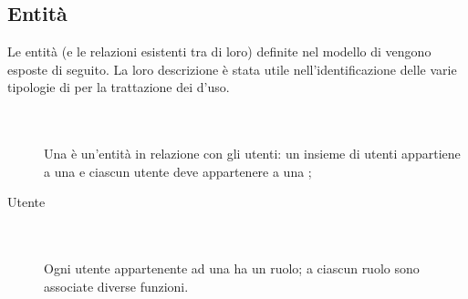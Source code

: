\subsection{Entit\`a}
Le entit\`a (e le relazioni esistenti tra di loro) definite nel modello  di  vengono esposte di seguito. La loro descrizione \`e stata utile nell'identificazione delle varie tipologie di  per la trattazione dei  d'uso.
\begin{description}
	\item[] \hfill \\\\
	Una  \`e un'entit\`a in relazione con gli utenti: un insieme di utenti appartiene a una  e ciascun utente deve appartenere a una ;
	\item[Utente] \hfill \\\\
	Ogni utente appartenente ad una  ha un ruolo; a ciascun ruolo sono associate diverse funzioni.	
	

\end{description}
